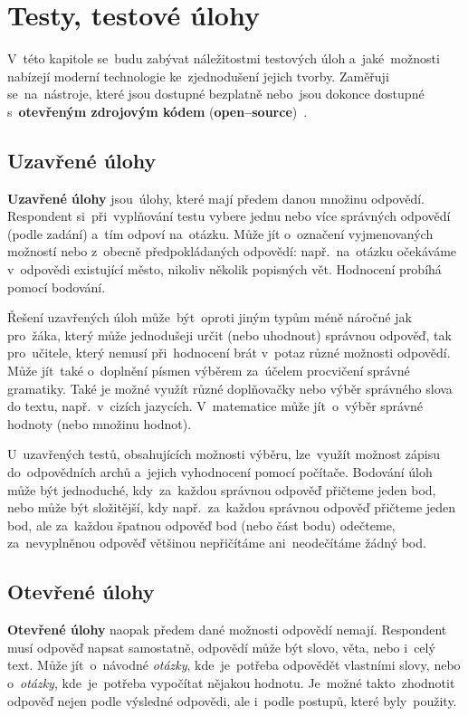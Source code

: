 \documentclass[11pt,a4paper]{report}
\begin{document}
    \chapter{Testy, testové úlohy}
         V~této kapitole se~budu zabývat náležitostmi testových úloh a~jaké~možnosti nabízejí moderní technologie ke~zjednodušení jejich tvorby. Zaměřuji se~na~nástroje, které jsou dostupné bezplatně nebo~jsou dokonce dostupné s~\textbf{otevřeným zdrojovým kódem} (\textbf{open--source})~\cite{fogel:opensource}.

        \section{Uzavřené úlohy}
            \textbf{Uzavřené úlohy} jsou~úlohy, které mají předem danou množinu odpovědí. Respondent si~při~vyplňování testu vybere jednu nebo více správných odpovědí (podle zadání) a~tím odpoví na~otázku. Může jít o~označení vyjmenovaných možností nebo z~obecně předpokládaných odpovědí: např.~na~otázku  očekáváme v~odpovědi existující město, nikoliv několik popisných vět. Hodnocení probíhá pomocí bodování.

            Řešení uzavřených úloh může~být~oproti jiným typům méně náročné jak pro~žáka, který může jednodušeji určit (nebo uhodnout) správnou odpověď, tak pro~učitele, který nemusí při~hodnocení brát v~potaz různé možnosti odpovědí. 
            Může jít~také o~doplnění písmen výběrem za~účelem procvičení správné gramatiky. Také je možné využít různé doplňovačky nebo výběr správného slova do textu, např.~v~cizích jazycích. V~matematice může jít~o~výběr správné hodnoty (nebo množinu hodnot). 
            
            U~uzavřených testů, obsahujících možnosti výběru, lze~využít možnost zápisu do~odpovědních archů a~jejich vyhodnocení pomocí počítače.
            Bodování úloh může být jednoduché, kdy~za~každou správnou odpověď přičteme jeden bod, nebo může být složitější, kdy např.~za~každou správnou odpověď přičteme jeden bod, ale za~každou špatnou odpověď bod (nebo část bodu) odečteme, za~nevyplněnou odpověď většinou nepřičítáme ani~neodečítáme žádný bod.

        \section{Otevřené úlohy}
            \textbf{Otevřené úlohy} naopak předem dané možnosti odpovědí nemají. Respondent musí odpověď napsat samostatně, odpovědí může být slovo, věta, nebo i~celý text. Může jít~o~návodné \emph{otázky}, kde~je~potřeba odpovědět vlastními slovy, nebo o~\emph{otázky}, kde~je~potřeba vypočítat nějakou hodnotu. Je~možné takto~zhodnotit odpověď nejen podle výsledné odpovědi, ale i~podle postupů, které byly~použity.
\end{document}
